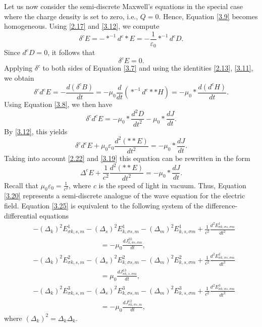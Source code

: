 \documentclass[english]{article}
\theoremstyle{plain}
\theoremstyle{definition}
\theoremstyle{remark}
\numberwithin{equation}{section}
\begin{document}
Let us now consider the semi-discrete Maxwell's equations in the special case where the charge density is set to zero, i.e., $Q=0$.
Hence, Equation \eqref{3.9} becomes homogeneous.
Using \eqref{2.17} and \eqref{3.12}, we compute
\begin{equation*}
  \delta^c E=-\ast^{-1}d^c\ast E=-\frac{1}{\varepsilon_0}\ast^{-1}d^cD.
 \end{equation*}
 Since $d^cD=0$, it follows that
 \begin{equation}\label{3.19}
  \delta^c E=0.
 \end{equation}
 Applying $\delta^c$ to both sides of Equation \eqref{3.7} and using the identities \eqref{2.13}, \eqref{3.11}, we obtain
 \begin{equation*}
  \delta^cd^c E=-\frac{d(\delta^cB)}{dt}=-\mu_0\frac{d}{dt}\left(\ast^{-1}d^c\ast\ast H\right)=-\mu_0\ast\frac{d(d^cH)}{dt}.
 \end{equation*}
  Using Equation \eqref{3.8}, we then have
 \begin{equation*}
  \delta^cd^c E=-\mu_0\ast\frac{d^2D}{dt^2}-\mu_0\ast\frac{dJ}{dt}.
 \end{equation*}
 By \eqref{3.12}, this  yields
 \begin{equation*}
  \delta^cd^c E+\mu_0\varepsilon_0\frac{d^2(\ast\ast E)}{dt^2}=-\mu_0\ast\frac{dJ}{dt}.
 \end{equation*}
 Taking into account \eqref{2.22} and \eqref{3.19} this equation can be rewritten in the form
 \begin{equation}\label{3.20}
  \Delta^cE+\frac{1}{c^2}\frac{d^2(\ast\ast E)}{dt^2}=-\mu_0\ast\frac{dJ}{dt}.
 \end{equation}
 Recall that $\mu_0\varepsilon_0=\frac{1}{c^2}$, where $c$ is the speed of light in vacuum.
 Thus, Equation \eqref{3.20} represents  a semi-discrete analogue of the wave equation for the electric field.
 Equation \eqref{3.25} is equivalent  to the following system of the difference-differential equations
 \begin{align*}\label{}
&-(\Delta_k)^2E^1_{\sigma k,s,m}-(\Delta_s)^2E^1_{k,\sigma s,m}-(\Delta_m)^2E^1_{k,s,\sigma m}+\frac{1}{c^2}\frac{d^2E^1_{\sigma k, \sigma s, \sigma m}}{dt^2}\\
& \hspace{4cm}=-\mu_0\frac{dJ^{23}_{k,\sigma s,\sigma m}}{dt},\\
&-(\Delta_k)^2E^2_{\sigma k,s,m}-(\Delta_s)^2E^2_{k,\sigma s,m}-(\Delta_m)^2E^2_{k,s,\sigma m}+\frac{1}{c^2}\frac{d^2E^2_{\sigma k, \sigma s, \sigma m}}{dt^2} \\
& \hspace{4cm}=\mu_0\frac{dJ^{13}_{\sigma k, s,\sigma m}}{dt},\\
&-(\Delta_k)^2E^3_{\sigma k,s,m}-(\Delta_s)^2E^3_{k,\sigma s,m}-(\Delta_m)^2E^3_{k,s,\sigma m}+\frac{1}{c^2}\frac{d^2E^3_{\sigma k,\sigma s,\sigma m}}{dt^2}\\
& \hspace{4cm}=-\mu_0\frac{dJ^{12}_{\sigma k,\sigma s, m}}{dt},
\end{align*}
 where $(\Delta_k)^2=\Delta_k\Delta_k$.
\end{document}
